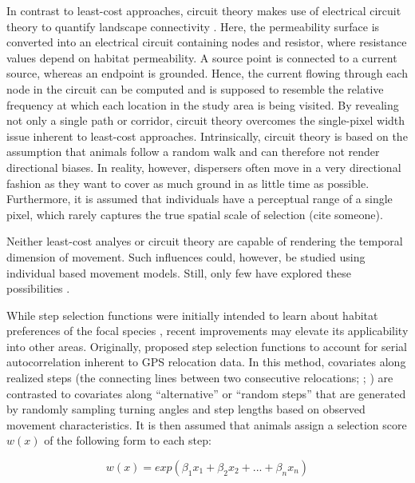 \documentclass[abstract=on,10pt,a4paper,bibliography=totocnumbered]{article}
\begin{document}
In contrast to least-cost approaches, circuit theory makes use of electrical
circuit theory to quantify landscape connectivity \citep{McRae.2006,
McRae.2008}. Here, the permeability surface is converted into an electrical
circuit containing nodes and resistor, where resistance values depend on habitat
permeability. A source point is connected to a current source, whereas an
endpoint is grounded. Hence, the current flowing through each node in the
circuit can be computed and is supposed to resemble the relative frequency at
which each location in the study area is being visited. By revealing not only a
single path or corridor, circuit theory overcomes the single-pixel width issue
inherent to least-cost approaches. Intrinsically, circuit theory is based on the
assumption that animals follow a random walk and can therefore not render
directional biases. In reality, however, dispersers often move in a very
directional fashion as they want to cover as much ground in as little time as
possible. Furthermore, it is assumed that individuals have a perceptual range of
a single pixel, which rarely captures the true spatial scale of selection (cite
someone).

Neither least-cost analyes or circuit theory are capable of rendering the
temporal dimension of movement. Such influences could, however, be studied using
individual based movement models. Still, only few have explored these
possibilities \citep{Kanangaraj.2013, Hauenstein.2019, Zeller.2020}.

While step selection functions were initially intended to learn about habitat
preferences of the focal species \citep{Fortin.2005}, recent improvements may
elevate its applicability into other areas. Originally, \cite{Fortin.2005}
proposed step selection functions to account for serial autocorrelation inherent
to GPS relocation data. In this method, covariates along realized steps (the
connecting lines between two consecutive relocations; ; \citealp{Turchin.1998})
are contrasted to covariates along  ``alternative''  or  ``random steps'' that
are generated by randomly sampling turning angles and step lengths based on
observed movement characteristics. It is then assumed that animals assign a
selection score \(w(x)\) of the following form to each step:

\begin{equation}
\label{EQ1}
  w(x) = exp(\beta_1 x_1 + \beta_2 x_2 + ... + \beta_n x_n)
\end{equation}
\end{document}

